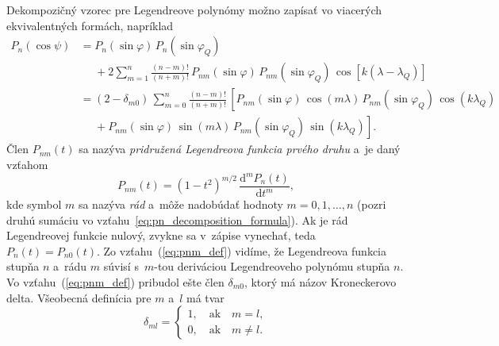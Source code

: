 \documentclass[a4paper,12pt]{book}
\newcommand{\diff}{\mathrm d}
\begin{document}
Dekompozičný vzorec pre Legendreove polynómy možno zapísať vo viacerých
ekvivalentných formách, napríklad
\parencite{Hobson,MoritzPhysicalGeodesy,SansoGeoidDetermination}
%
\begin{equation}
\label{eq:pn_decomposition_formula}
\begin{split}
P_n(\cos\psi) &= P_n(\sin\varphi) \, P_n(\sin\varphi_Q)\\
%
&\phantom{={}} +2 \sum_{m = 1}^{n} \frac{(n - m)!}{(n + m)!} \,
P_{nm}(\sin\varphi) \, P_{nm}(\sin\varphi_Q) \, \cos\left[k (\lambda
- \lambda_Q) \right]\\
%
&= (2 - \delta_{m0}) \, \sum_{m = 0}^{n} \frac{(n - m)!}{(n + m)!} \, \left[
P_{nm}(\sin\varphi) \, \cos(m\lambda) \, P_{nm}(\sin\varphi_Q) \,
\cos(k\lambda_Q)\right.\\
%
&\phantom{={}}+\left. P_{nm}(\sin\varphi) \, \sin(m\lambda) \,
P_{nm}(\sin\varphi_Q) \, \sin(k\lambda_Q)\right]{.}
\end{split}
\end{equation}
%
Člen $P_{nm}(t)$ sa nazýva \emph{pridružená Legendreova funkcia prvého druhu}
a~je daný vzťahom
%
\begin{equation}
\label{eq:pnm_def}
P_{nm}(t) = (1 - t^2)^{m \slash 2} \, \frac{\diff^m P_n(t)}{\diff t^m}{,}
\end{equation}
%
kde symbol $m$ sa nazýva \emph{rád} a~môže nadobúdať hodnoty $m = 0, 1, \dots,
n$ (pozri druhú sumáciu vo vzťahu~\ref{eq:pn_decomposition_formula}).  Ak je 
rád Legendreovej funkcie nulový, zvykne sa v~zápise vynechať, teda $P_n(t)
= P_{n0}(t)$.  Zo vzťahu~(\ref{eq:pnm_def}) vidíme, že Legendreova funkcia
stupňa $n$ a~rádu $m$ súvisí s~$m$-tou deriváciou Legendreoveho polynómu stupňa
$n$.  Vo vzťahu~(\ref{eq:pnm_def}) pribudol ešte člen $\delta_{m0}$, ktorý má
názov Kroneckerovo delta.  Všeobecná definícia pre $m$ a~$l$ má tvar
%
\begin{equation}
\delta_{ml} =
%
\begin{cases}
1{,} \quad \mathrm{ak} \quad m = l{,}\\
0{,} \quad \mathrm{ak} \quad m \neq l{.}
\end{cases}
\end{equation}
\end{document}
